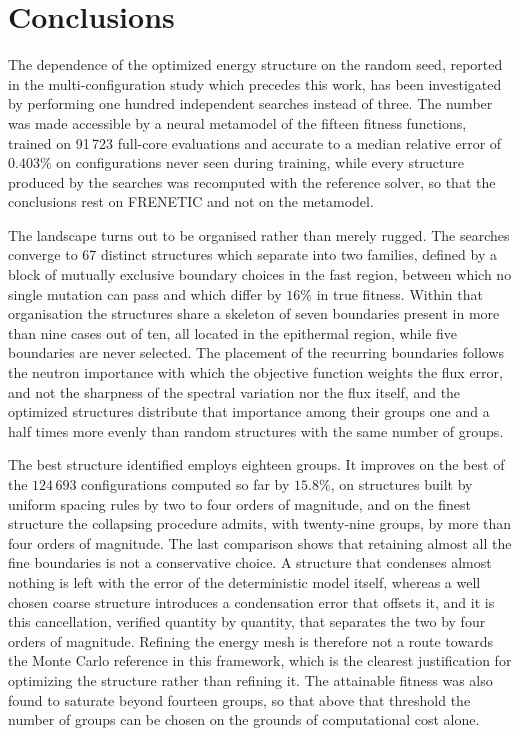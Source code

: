 \documentclass{style/nseJournal}
\begin{document}
\section{Conclusions}

The dependence of the optimized energy structure on the random seed, reported in
the multi-configuration study which precedes this work, has been investigated by
performing one hundred independent searches instead of three. The number was
made accessible by a neural metamodel of the fifteen fitness functions, trained
on 91\,723 full-core evaluations and accurate to a median relative error of
$0.403\%$ on configurations never seen during training, while every structure
produced by the searches was recomputed with the reference solver, so that the
conclusions rest on FRENETIC and not on the metamodel.

The landscape turns out to be organised rather than merely rugged. The searches
converge to 67 distinct structures which separate into two families, defined by
a block of mutually exclusive boundary choices in the fast region, between which
no single mutation can pass and which differ by $16\%$ in true fitness. Within
that organisation the structures share a skeleton of seven boundaries present in
more than nine cases out of ten, all located in the epithermal region, while
five boundaries are never selected. The placement of the recurring boundaries
follows the neutron importance with which the objective function weights the
flux error, and not the sharpness of the spectral variation nor the flux itself,
and the optimized structures distribute that importance among their groups one
and a half times more evenly than random structures with the same number of
groups.

The best structure identified employs eighteen groups. It improves on the best
of the $124\,693$ configurations computed so far by $15.8\%$, on structures
built by uniform spacing rules by two to four orders of magnitude, and on the
finest structure the collapsing procedure admits, with twenty-nine groups, by
more than four orders of magnitude. The last comparison shows that retaining
almost all the fine boundaries is not a conservative choice. A structure that
condenses almost nothing is left with the error of the deterministic model
itself, whereas a well chosen coarse structure introduces a condensation error
that offsets it, and it is this cancellation, verified quantity by quantity,
that separates the two by four orders of magnitude. Refining the energy mesh is
therefore not a route towards the Monte Carlo reference in this framework, which
is the clearest justification for optimizing the structure rather than refining
it. The attainable fitness was also found to saturate beyond fourteen groups, so
that above that threshold the number of groups can be chosen on the grounds of
computational cost alone.
\end{document}
